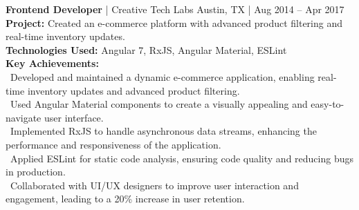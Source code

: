 {\textbf{Frontend Developer} | Creative Tech Labs \hfill Austin, TX | Aug 2014 – Apr 2017} \\
\textbf{Project:} Created an e-commerce platform with advanced product filtering and real-time inventory updates. \\
\textbf{Technologies Used:} Angular 7, RxJS, Angular Material, ESLint \\
\textbf{Key Achievements:} \\[4pt]
\hspace*{4pt} \textbullet~Developed and maintained a dynamic e-commerce application, enabling real-time inventory updates and advanced product filtering. \\
\hspace*{4pt} \textbullet~Used Angular Material components to create a visually appealing and easy-to-navigate user interface. \\
\hspace*{4pt} \textbullet~Implemented RxJS to handle asynchronous data streams, enhancing the performance and responsiveness of the application. \\
\hspace*{4pt} \textbullet~Applied ESLint for static code analysis, ensuring code quality and reducing bugs in production. \\
\hspace*{4pt} \textbullet~Collaborated with UI/UX designers to improve user interaction and engagement, leading to a 20\% increase in user retention. \\
